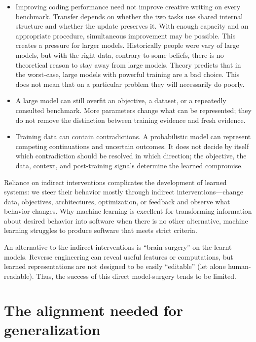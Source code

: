 \documentclass[11pt,twoside]{article}
\theoremstyle{definition}
\theoremstyle{remark}
\begin{document}
\begin{itemize}[leftmargin=*]
\item Improving coding performance need not improve creative writing on every
  benchmark. Transfer depends on whether the two tasks use shared internal
  structure and whether the update preserves it. With enough capacity and an
  appropriate procedure, simultaneous improvement may be possible. This creates
  a pressure for larger models. Historically people were vary of large models,
  but with the right data, contrary to some beliefs, there is no theoretical
  reason to stay away from large models. Theory predicts that in the worst-case,
  large models with powerful training are a bad choice. This does not mean that
  on a particular problem they will necessarily do poorly.
\item A large model can still overfit an objective, a dataset, or a repeatedly
  consulted benchmark. More parameters change what can be represented; they do
  not remove the distinction between training evidence and fresh evidence.
\item Training data can contain contradictions. A probabilistic model can
  represent competing continuations and uncertain outcomes. It does not decide
  by itself which contradiction should be resolved in which direction; the
  objective, the data, context, and post-training signals determine the
  learned compromise.
\end{itemize}

Reliance on indirect interventions complicates the development of learned
systems: we steer their behavior mostly
through indirect interventions---change data, objectives,
architectures, optimization, or feedback and observe what behavior changes.
Why machine learning is excellent for transforming information
about desired behavior into software when there is no other alternative,
machine learning struggles to produce software that meets strict criteria.

An alternative to the indirect interventions is ``brain surgery'' on the learnt models.
Reverse engineering can reveal useful features or computations, but learned
representations are not designed to be easily ``editable'' (let alone
human-readable). Thus, the success of this direct model-surgery tends
to be limited.

\section{The alignment needed for generalization}
\end{document}
